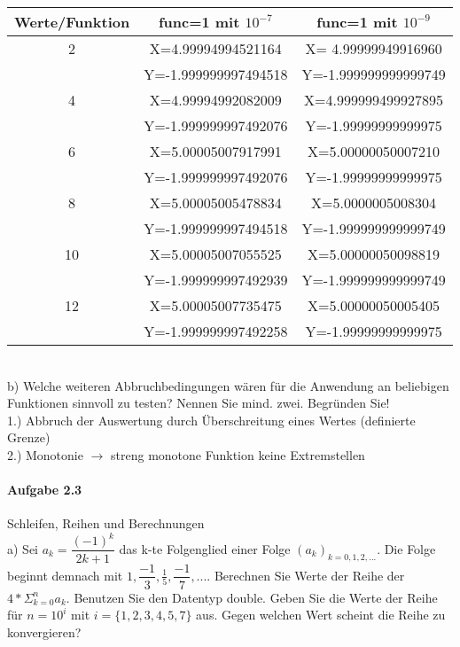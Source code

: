 \documentclass[paper=a4, fontsize=11pt]{scrartcl}
\numberwithin{equation}{section}
\numberwithin{figure}{section}
\numberwithin{table}{section}
\begin{document}
 \begin{tabular}{|c|c|c|}
  \hline
   Werte/Funktion & func=1 mit $10^{-7}$ & func=1 mit $10^{-9}$ \\ 
   \hline
   2 & X=4.99994994521164  & X= 4.99999949916960 \\ 
     & Y=-1.999999997494518 & Y=-1.999999999999749\\
   \hline
   4 & X=4.99994992082009 & X=4.999999499927895 \\ 
     & Y=-1.999999997492076 & Y=-1.99999999999975 \\
   \hline
   6 & X=5.00005007917991  & X=5.00000050007210 \\ 
     & Y=-1.999999997492076 & Y=-1.99999999999975 \\
   \hline
   8 & X=5.00005005478834  & X=5.0000005008304 \\ 
     & Y=-1.999999997494518 & Y=-1.999999999999749 \\
   \hline
   10 & X=5.00005007055525  & X=5.00000050098819 \\ 
      & Y=-1.999999997492939 & Y=-1.999999999999749 \\
   \hline
   12 & X=5.00005007735475  & X=5.00000050005405 \\ 
      & Y=-1.999999997492258 & Y=-1.99999999999975 \\
   \hline 
 \end{tabular} 
 \\

b) Welche weiteren Abbruchbedingungen wären für die Anwendung an beliebigen Funktionen sinnvoll zu testen? Nennen Sie mind. zwei. Begründen Sie! \\

1.) Abbruch der Auswertung durch Überschreitung eines Wertes (definierte Grenze)\\
2.) Monotonie $ \rightarrow $ streng monotone Funktion keine Extremstellen \\


\paragraph{Aufgabe 2.3} Schleifen, Reihen und Berechnungen \\

a) Sei $a_{k} = \dfrac{(-1)^{k}}{2k+1}$ das k-te Folgenglied einer Folge $(a_{k})_{k=0,1,2,...}$. Die Folge beginnt demnach mit $1, \dfrac{-1}{3}, \frac{1}{5}, \dfrac{-1}{7}, ...$. Berechnen Sie Werte der Reihe der $4* \Sigma^{n}_{k=0} a_{k}$. Benutzen Sie den Datentyp double. Geben Sie die Werte der Reihe für $n=10^{i}$ mit $i=\lbrace 1,2,3,4,5,7 \rbrace$ aus. Gegen welchen Wert scheint die Reihe zu konvergieren? \\
\end{document}
